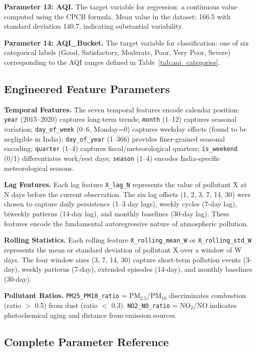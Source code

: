 \documentclass[12pt,a4paper]{report}
\begin{document}
\textbf{Parameter 13: AQI.} The target variable for regression: a continuous value computed using the CPCB formula. Mean value in the dataset: 166.5 with standard deviation 140.7, indicating substantial variability.

\textbf{Parameter 14: AQI\_Bucket.} The target variable for classification: one of six categorical labels (Good, Satisfactory, Moderate, Poor, Very Poor, Severe) corresponding to the AQI ranges defined in Table~\ref{tab:aqi_categories}.

\subsection{Engineered Feature Parameters}

\textbf{Temporal Features.} The seven temporal features encode calendar position: \texttt{year} (2015--2020) captures long-term trends; \texttt{month} (1--12) captures seasonal variation; \texttt{day\_of\_week} (0--6, Monday=0) captures weekday effects (found to be negligible in India); \texttt{day\_of\_year} (1--366) provides finer-grained seasonal encoding; \texttt{quarter} (1--4) captures fiscal/meteorological quarters; \texttt{is\_weekend} (0/1) differentiates work/rest days; \texttt{season} (1--4) encodes India-specific meteorological seasons.

\textbf{Lag Features.} Each lag feature \texttt{X\_lag\_N} represents the value of pollutant X at N days before the current observation. The six lag offsets (1, 2, 3, 7, 14, 30) were chosen to capture daily persistence (1--3 day lags), weekly cycles (7-day lag), biweekly patterns (14-day lag), and monthly baselines (30-day lag). These features encode the fundamental autoregressive nature of atmospheric pollution.

\textbf{Rolling Statistics.} Each rolling feature \texttt{X\_rolling\_mean\_W} or \texttt{X\_rolling\_std\_W} represents the mean or standard deviation of pollutant X over a window of W days. The four window sizes (3, 7, 14, 30) capture short-term pollution events (3-day), weekly patterns (7-day), extended episodes (14-day), and monthly baselines (30-day).

\textbf{Pollutant Ratios.} \texttt{PM25\_PM10\_ratio} = PM$_{2.5}$/PM$_{10}$ discriminates combustion (ratio $>$ 0.5) from dust (ratio $<$ 0.3). \texttt{NO2\_NO\_ratio} = NO$_2$/NO indicates photochemical aging and distance from emission sources.

\subsection{Complete Parameter Reference}
\end{document}
